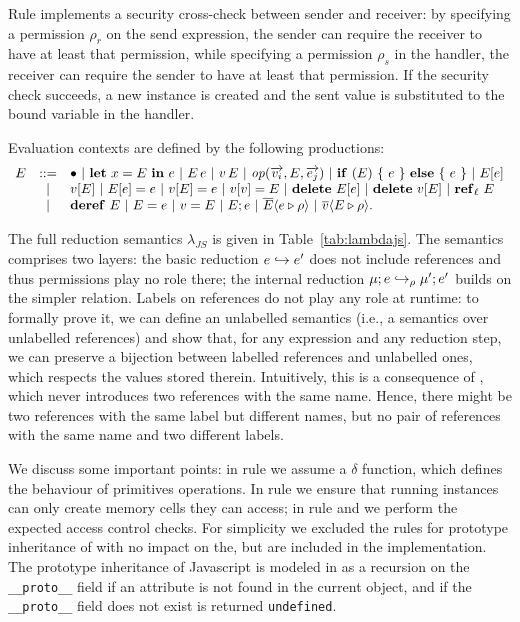 Rule  implements a security cross-check between sender and receiver: by specifying a permission $\rho_r$ on the send expression, the sender can require the receiver to have at least that permission, while specifying a permission $\rho_s$ in the handler, the receiver can require the sender to have at least that permission. If the security check succeeds, a new instance is created and the sent value is substituted to the bound variable in the handler.

Evaluation contexts are defined by the following productions:
$$
\begin{array}{lcl}
E & ::= & \bullet ~|~ \mathbf{let}\ x = E\ \mathbf{in}\ e ~|~ E\, e~|~v\, E ~|~ \mathit{op}(\overrightarrow{v_i},E,\overrightarrow{e_j}) ~|~ \mathbf{if}\ (E)\ \{\ e\ \}\ \mathbf{else}\ \{\ e\ \} ~|~ E[e] \\
& | & v[E] ~|~ E[e] = e ~|~ v[E] = e ~|~ v[v] = E ~|~ \mathbf{delete}\ E[e] ~|~ \mathbf{delete}\ v[E] ~|~ \mathbf{ref}_{\ell}\ E \\
& | &  \mathbf{deref}\ E ~|~ E = e ~|~ v = E ~|~ E;e ~|~ \overline{E} \langle e \triangleright \rho \rangle~|~\overline{v} \langle E \triangleright \rho \rangle.
\end{array}
$$

The full reduction semantics $\lambda_{JS}$ is given in
Table~\ref{tab:lambdajs}. The semantics comprises two layers: the
basic reduction $e \hookrightarrow e'$ does not include references and thus
permissions play no role there; the internal reduction $\mu;e \hookrightarrow_\rho
\mu';e'$ builds on the simpler relation. Labels on references do not
play any role at runtime: to formally prove it, we can define an
unlabelled semantics (i.e., a semantics over unlabelled references) and
show that, for any expression and any reduction step, we can preserve
a bijection between labelled references and unlabelled ones, which
respects the values stored therein. Intuitively, this is a consequence
of , which never introduces two references with the same
name. Hence, there might be two references with the same label but
different names, but no pair of references with the same name and two
different labels.

We discuss some important points: in rule  we assume a $\delta$ function, which defines the behaviour of primitives operations. In rule  we ensure that running instances can only create memory cells they can access; in rule  and  we perform the expected access control checks. For simplicity we excluded the rules for prototype inheritance of \ljs with no impact on the, but are included in the implementation. The prototype inheritance of Javascript is modeled in \ljs as a recursion on the \texttt{\_\_proto\_\_} field if an attribute is not found in the current object, and if the \texttt{\_\_proto\_\_} field does not exist is returned \texttt{undefined}.

